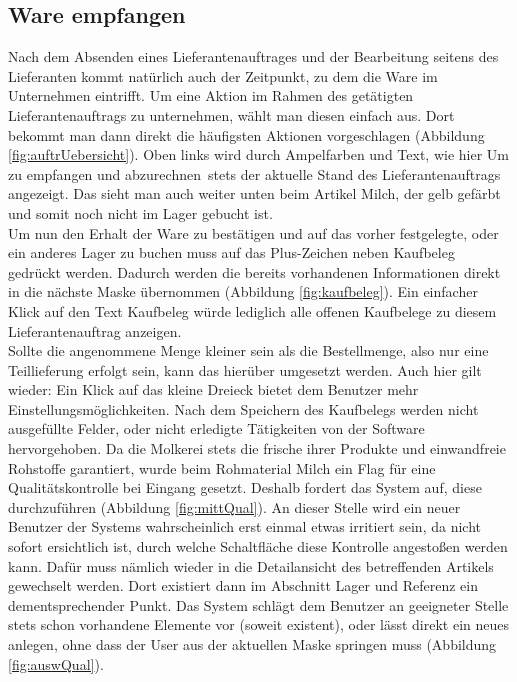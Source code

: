 \subsection{Ware empfangen}
Nach dem Absenden eines Lieferantenauftrages und der Bearbeitung seitens des Lieferanten kommt natürlich auch der Zeitpunkt, zu dem die Ware im Unternehmen eintrifft. Um eine Aktion im Rahmen des getätigten Lieferantenauftrags zu unternehmen, wählt man diesen einfach aus. Dort bekommt man dann direkt die häufigsten Aktionen vorgeschlagen (\vgl Abbildung \ref{fig:auftrUebersicht}). Oben links wird durch Ampelfarben und Text, wie hier \glqq Um zu empfangen und abzurechnen\grqq\ stets der aktuelle Stand des Lieferantenauftrags angezeigt. Das sieht man auch weiter unten beim Artikel Milch, der gelb gefärbt und somit noch nicht im Lager gebucht ist. \\
Um nun den Erhalt der Ware zu bestätigen und auf das vorher festgelegte, oder ein anderes Lager zu buchen muss auf das Plus-Zeichen neben Kaufbeleg gedrückt werden. Dadurch werden die bereits vorhandenen Informationen direkt in die nächste Maske übernommen (\vgl Abbildung \ref{fig:kaufbeleg}). Ein einfacher Klick auf den Text Kaufbeleg würde lediglich alle offenen Kaufbelege zu diesem Lieferantenauftrag anzeigen. \\
Sollte die angenommene Menge kleiner sein als die Bestellmenge, also nur eine Teillieferung erfolgt sein, kann das hierüber umgesetzt werden. Auch hier gilt wieder: Ein Klick auf das kleine Dreieck bietet dem Benutzer mehr Einstellungsmöglichkeiten. Nach dem Speichern des Kaufbelegs werden nicht ausgefüllte Felder, oder nicht erledigte Tätigkeiten von der Software hervorgehoben. Da die Molkerei stets die frische ihrer Produkte und einwandfreie Rohstoffe garantiert, wurde beim Rohmaterial Milch ein Flag für eine Qualitätskontrolle bei Eingang gesetzt. Deshalb fordert das System auf, diese durchzuführen (\vgl Abbildung \ref{fig:mittQual}). An dieser Stelle wird ein neuer Benutzer der Systems wahrscheinlich erst einmal etwas irritiert sein, da nicht sofort ersichtlich ist, durch welche Schaltfläche diese Kontrolle angestoßen werden kann. Dafür muss nämlich wieder in die Detailansicht des betreffenden Artikels gewechselt werden. Dort existiert dann im Abschnitt Lager und Referenz ein dementsprechender Punkt. Das System schlägt dem Benutzer an geeigneter Stelle stets schon vorhandene Elemente vor (soweit existent), oder lässt direkt ein neues anlegen, ohne dass der User aus der aktuellen Maske springen muss (\vgl Abbildung \ref{fig:auswQual}). \\
